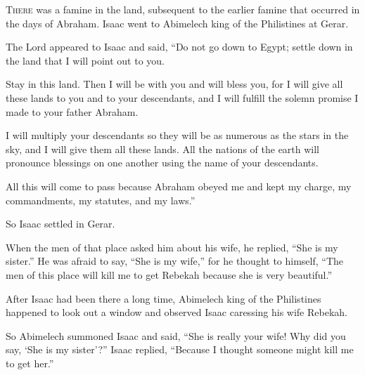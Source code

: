 \begin{scripture}
 \allowchapbreak\hypertarget{ch-genesis-26}{}\lettrine[lines=5]{\color{pentateuch}T}{\textsc{here}} was a famine in the land, subsequent to the earlier famine that occurred in the days of Abraham. Isaac went to Abimelech king of the Philistines at Gerar.\everypar{}
 The Lord appeared to Isaac and said, ``Do not go down to Egypt; settle down in the land that I will point out to you.
 Stay in this land. Then I will be with you and will bless you, for I will give all these lands to you and to your descendants, and I will fulfill the solemn promise I made to your father Abraham.
 I will multiply your descendants so they will be as numerous as the stars in the sky, and I will give them all these lands. All the nations of the earth will pronounce blessings on one another using the name of your descendants.
 All this will come to pass because Abraham obeyed me and kept my charge, my commandments, my statutes, and my laws.''
 So Isaac settled in Gerar.
\everypar{}

 When the men of that place asked him about his wife, he replied, ``She is my sister.'' He was afraid to say, ``She is my wife,'' for he thought to himself, ``The men of this place will kill me to get Rebekah because she is very beautiful.''
\everypar{}

 After Isaac had been there a long time, Abimelech king of the Philistines happened to look out a window and observed Isaac caressing his wife Rebekah.
 So Abimelech summoned Isaac and said, ``She is really your wife! Why did you say, `She is my sister'?'' Isaac replied, ``Because I thought someone might kill me to get her.''
\everypar{}


\end{scripture}
